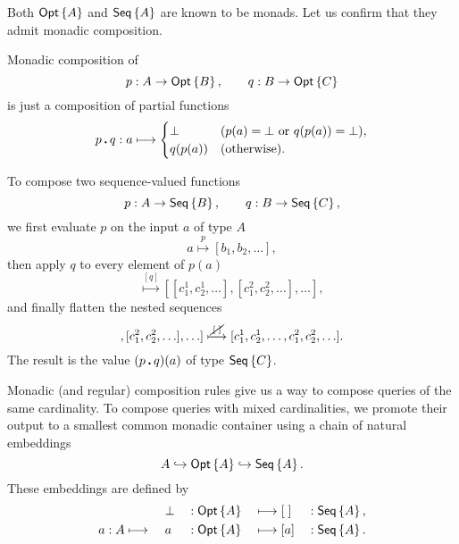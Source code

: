 Both $\textup{\textsf{Opt}}\left\{A\right\}$ and $\textup{\textsf{Seq}}\left\{A\right\}$ are known to be monads.  Let us confirm that they
admit monadic composition.

Monadic composition of
\begin{equation*}
    p : A \to \textup{\textsf{Opt}}\left\{B\right\}, \qquad q : B \to \textup{\textsf{Opt}}\left\{C\right\}
\end{equation*}
is just a composition of partial functions
\begin{equation*}
    p\,\boldsymbol{.}\,q : a \longmapsto \begin{cases}
        \bot & (p(a)=\bot\text{ or }q(p(a))=\bot), \\
        q(p(a)) & (\text{otherwise}).
    \end{cases}
\end{equation*}

To compose two sequence-valued functions
\begin{equation*}
    p : A \to \textup{\textsf{Seq}}\left\{B\right\}, \qquad q : B \to \textup{\textsf{Seq}}\left\{C\right\},
\end{equation*}
we first evaluate $p$ on the input $a$ of type $A$
\begin{equation*}
    a \overset{p}{\longmapsto} [b_1, b_2, \ldots],
\end{equation*}
then apply $q$ to every element of $p(a)$
\begin{equation*}
    [b_1, b_2, \ldots]
    \overset{[q]}{\longmapsto}
    [[c^{1}_{1}, c^{1}_{2}, \ldots], [c^{2}_{1}, c^{2}_{2}, \ldots], \ldots],
\end{equation*}
and finally flatten the nested sequences
\begin{equation*}
    [[c^{1}_{1}, c^{1}_{2}, \ldots], [c^{2}_{1}, c^{2}_{2}, \ldots], \ldots]
    \overset{\cancel{\,[\;]\,}}{\longmapsto}
    [c^{1}_{1}, c^{1}_{2}, \ldots, c^{2}_{1}, c^{2}_{2}, \ldots].
\end{equation*}
The result is the value $(p\,\boldsymbol{.}\,q)(a)$ of type $\textup{\textsf{Seq}}\left\{C\right\}$.

Monadic (and regular) composition rules give us a way to compose queries of the
same cardinality.  To compose queries with mixed cardinalities, we promote
their output to a smallest common monadic container using a chain of natural
embeddings
\begin{equation*}
    A \hookrightarrow \textup{\textsf{Opt}}\left\{A\right\} \hookrightarrow \textup{\textsf{Seq}}\left\{A\right\}.
\end{equation*}
These embeddings are defined by
\begin{alignat*}{5}
    & \; && \bot && : \textup{\textsf{Opt}}\left\{A\right\} && \longmapsto [\;] && : \textup{\textsf{Seq}}\left\{A\right\}, \\
    & a : A \longmapsto\ && a && : \textup{\textsf{Opt}}\left\{A\right\} && \longmapsto [a] && : \textup{\textsf{Seq}}\left\{A\right\}.
\end{alignat*}

